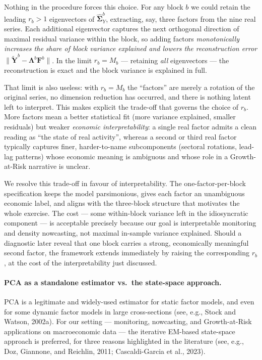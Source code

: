 \documentclass[11pt, a4paper, oneside]{article}
\begin{document}
Nothing in the procedure forces this choice. For any block $b$ we
could retain the leading $r_b > 1$ eigenvectors of
$\widehat{\boldsymbol{\Sigma}}^b_Y$, extracting, say, three factors
from the nine real series. Each additional eigenvector captures the
next orthogonal direction of maximal residual variance within the
block, so adding factors \emph{monotonically increases the share of
block variance explained and lowers the reconstruction error}
$\|\tilde{\mathbf{Y}}^b - \boldsymbol{\Lambda}^b \mathbf{F}^b\|$. In
the limit $r_b = M_b$ — retaining \emph{all} eigenvectors — the
reconstruction is exact and the block variance is explained in full.

That limit is also useless: with $r_b = M_b$ the ``factors'' are
merely a rotation of the original series, no dimension reduction has
occurred, and there is nothing latent left to interpret. This makes
explicit the trade-off that governs the choice of $r_b$. More factors
mean a better statistical fit (more variance explained, smaller
residuals) but weaker \emph{economic interpretability}: a single
real factor admits a clean reading as ``the state of real activity'',
whereas a second or third real factor typically captures finer,
harder-to-name subcomponents (sectoral rotations, lead-lag patterns)
whose economic meaning is ambiguous and whose role in a
Growth-at-Risk narrative is unclear.

We resolve this trade-off in favour of interpretability. The
one-factor-per-block specification keeps the model parsimonious,
gives each factor an unambiguous economic label, and aligns with the
three-block structure that motivates the whole exercise. The cost —
some within-block variance left in the idiosyncratic component — is
acceptable precisely because our goal is interpretable monitoring and
density nowcasting, not maximal in-sample variance explained. Should
a diagnostic later reveal that one block carries a strong, economically
meaningful second factor, the framework extends immediately by raising
the corresponding $r_b$, at the cost of the interpretability just
discussed.

\paragraph{PCA as a standalone estimator vs.\ the state-space approach.}
PCA is a legitimate and widely-used estimator for static factor
models, and even for some dynamic factor models in large
cross-sections (see, e.g., Stock and Watson, 2002a). For our setting
— monitoring, nowcasting, and Growth-at-Risk applications on
macroeconomic data — the iterative EM-based state-space approach is
preferred, for three reasons highlighted in the literature (see, e.g., Doz, Giannone, and Reichlin, 2011; Cascaldi-Garcia et al., 2023).
\end{document}
